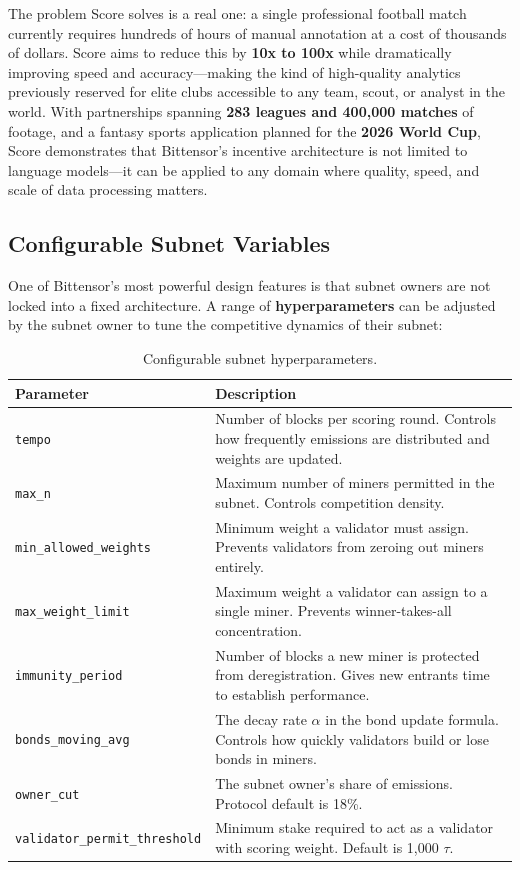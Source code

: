\documentclass[12pt, a4paper, oneside]{report}
\newcommand{\TAO}{$\tau$}            %
\theoremstyle{definition}
\begin{document}
The problem Score solves is a real one: a single professional football match 
currently requires hundreds of hours of manual annotation at a cost of 
thousands of dollars. Score aims to reduce this by \textbf{10x to 100x} 
while dramatically improving speed and accuracy—making the kind of 
high-quality analytics previously reserved for elite clubs accessible to 
any team, scout, or analyst in the world. With partnerships spanning 
\textbf{283 leagues and 400,000 matches} of footage, and a fantasy sports 
application planned for the \textbf{2026 World Cup}, Score demonstrates 
that Bittensor's incentive architecture is not limited to language 
models—it can be applied to any domain where quality, speed, and scale 
of data processing matters.

\subsection{Configurable Subnet Variables}

One of Bittensor's most powerful design features is that subnet owners are 
not locked into a fixed architecture. A range of \textbf{hyperparameters} 
can be adjusted by the subnet owner to tune the competitive dynamics of their 
subnet:

\begin{table}[H]
\centering
\renewcommand{\arraystretch}{1.8}
\begin{tabular}{p{4.5cm} p{8.5cm}}
\toprule
\textbf{Parameter} & \textbf{Description} \\
\midrule
\texttt{tempo} & Number of blocks per scoring round. Controls how frequently 
emissions are distributed and weights are updated. \\
\texttt{max\_n} & Maximum number of miners permitted in the subnet. Controls 
competition density. \\
\texttt{min\_allowed\_weights} & Minimum weight a validator must assign. 
Prevents validators from zeroing out miners entirely. \\
\texttt{max\_weight\_limit} & Maximum weight a validator can assign to a 
single miner. Prevents winner-takes-all concentration. \\
\texttt{immunity\_period} & Number of blocks a new miner is protected from 
deregistration. Gives new entrants time to establish performance. \\
\texttt{bonds\_moving\_avg} & The decay rate $\alpha$ in the bond update 
formula. Controls how quickly validators build or lose bonds in miners. \\
\texttt{owner\_cut} & The subnet owner's share of emissions. Protocol default 
is 18\%. \\
\texttt{validator\_permit\_threshold} & Minimum stake required to act as a 
validator with scoring weight. Default is 1,000 \TAO. \\
\bottomrule
\end{tabular}
\caption{Configurable subnet hyperparameters.}
\label{tab:hyperparams}
\end{table}
\end{document}
